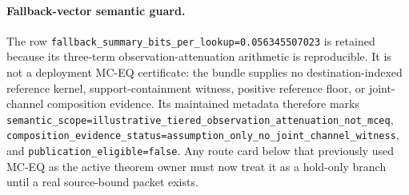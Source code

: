 \documentclass[11pt]{article}
\begin{document}
\paragraph{Fallback-vector semantic guard.}
The row \texttt{fallback\_summary\_bits\_per\_lookup=0.056345507023} is retained because its three-term observation-attenuation arithmetic is reproducible.  It is not a deployment MC-EQ certificate: the bundle supplies no destination-indexed reference kernel, support-containment witness, positive reference floor, or joint-channel composition evidence.  Its maintained metadata therefore marks \texttt{semantic\_scope=illustrative\_tiered\_observation\_attenuation\_not\_mceq}, \texttt{composition\_evidence\_status=assumption\_only\_no\_joint\_channel\_witness}, and \texttt{publication\_eligible=false}.  Any route card below that previously used MC-EQ as the active theorem owner must now treat it as a hold-only branch until a real source-bound packet exists.
\end{document}
